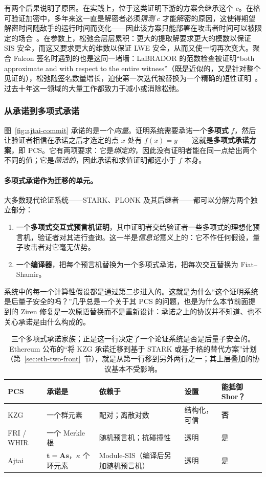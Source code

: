 有两个后果说明了原因。在实践上，位于这类证明下游的方案会继承这个 $c$。在格可验证加密中，多年来这一直是解密者必须\emph{猜测} $c$ 才能解密的原因，这使得期望解密时间随敌手的运行时间而变化——因此该方案只能部署在攻击者时间可以被限定的场合~\cite{lnp2022}。在参数上，松弛会层层累积：更大的提取解要求更大的模数以保证 SIS 安全，而这又要求更大的维数以保证 LWE 安全，从而又使一切再次变大。聚合 Falcon 签名时遇到的也是这同一堵墙：LaBRADOR 的范数检查被证明“both approximate and with respect to the entire witness”（既是近似的，又是针对整个见证的），松弛随签名数量增长，迫使第一次迭代被替换为一个精确的短性证明~\cite{falconagg2024}。过去十年这一领域的大量工作都致力于减小或消除松弛。

\subsubsection{从承诺到多项式承诺}
图~\ref{fig:ajtai-commit} 承诺的是一个\emph{向量}。证明系统需要承诺一个\textbf{多项式} $f$，然后让验证者相信在承诺之后才选定的点 $x$ 处有 $f(x)=y$——这就是\textbf{多项式承诺方案}，即 PCS。它有两项要求：它是\emph{绑定的}，因此没有证明者能在同一点给出两个不同的值；它是\emph{简洁的}，因此承诺和求值证明都远小于 $f$ 本身。

\paragraph{多项式承诺作为迁移的单元。}
大多数现代论证系统——STARK、PLONK 及其后继者——都可以分解为两个独立部分：
\begin{enumerate}
  \item 一个\textbf{多项式交互式预言机证明}，其中证明者交给验证者一些多项式的理想化预言机，验证者对其进行查询。这一半是\emph{信息论}意义上的：它不作任何假设，量子攻击者对它毫无优势。
  \item 一个\textbf{编译器}，把每个预言机替换为一个多项式承诺，把每次交互替换为 Fiat--Shamir。
\end{enumerate}
系统中的每一个计算性假设都是通过第二步进入的。这就是为什么“这个证明系统是后量子安全的吗？”几乎总是一个关于其 PCS 的问题，也是为什么本节前面提到的 Ziren 修复是一次原语替换而不是重新设计：承诺之上的协议并不知道、也不关心承诺是由什么构成的。

\begin{table}[H]
\centering
\small
\begin{tabular}{@{}p{2.3cm}p{3.5cm}p{3.4cm}p{2.2cm}p{2.4cm}@{}}
\toprule
PCS & 承诺是 & 依赖于 & 设置 & 能抵御 Shor？ \\
\midrule
KZG & 一个群元素 & 配对；离散对数 & 结构化，可信 & \textbf{否} \\
FRI / WHIR & 一个 Merkle 根 & 随机预言机；抗碰撞性 & 透明 & 是 \\
Ajtai & $\mathbf{t}=\mathbf{A}\mathbf{s}$，$\kappa$ 个环元素 & Module-SIS（编译后另加随机预言机） & 透明 & 是 \\
\bottomrule
\end{tabular}
\caption{三个多项式承诺家族；正是这一行决定了一个论证系统是否是后量子安全的。Ethereum 公布的“将 KZG 承诺迁移到基于 STARK 或基于格的替代方案”计划（第~\ref{sec:eth-two-front}~节），就是从第一行移到另外两行之一；其上层叠加的协议基本不受影响。}
\label{tab:pcs-families}
\end{table}

